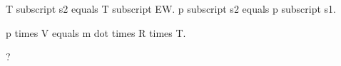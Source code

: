 T subscript s2 equals T subscript EW.  
p subscript s2 equals p subscript s1.  

p times V equals m dot times R times T.  

?